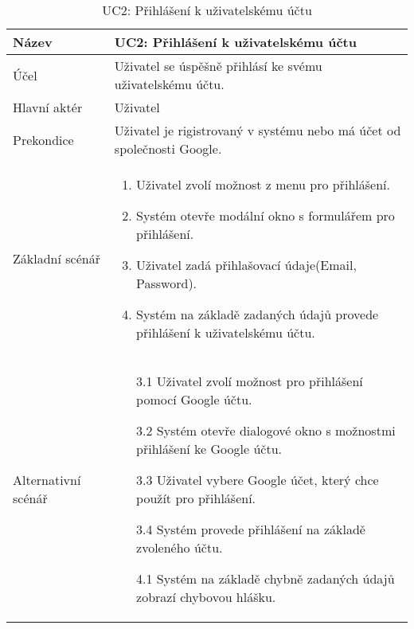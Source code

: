\begin{table}[h]
	\caption{UC2: Přihlášení k uživatelskému účtu}
	\label{tab:uc3}
\begin{tabular}{p{4cm} | p{12cm} }
Název & UC2: Přihlášení k uživatelskému účtu \\ \hline
Účel &   Uživatel se úspěšně přihlásí ke svému uživatelskému účtu. \\\hline
Hlavní aktér  & Uživatel  \\ \hline
Prekondice & Uživatel je rigistrovaný v systému nebo má účet od společnosti Google. \\ \hline

        Základní scénář &  \begin{enumerate}
     \item Uživatel zvolí možnost z menu pro přihlášení.
     \item Systém otevře modální okno s formulářem pro přihlášení.
     \item Uživatel zadá přihlašovací údaje(Email, Password).
     \item Systém na základě zadaných údajů provede přihlášení k uživatelskému účtu. 

\end{enumerate}\\ \hline
Alternativní scénář  & 

\begin{itemize}
    \item [3.1] Uživatel zvolí možnost pro přihlášení pomocí Google účtu. 
    \item [3.2] Systém otevře dialogové okno s možnostmi přihlášení ke Google účtu. 
    \item [3.3] Uživatel vybere Google účet, který chce použít pro přihlášení.
    \item [3.4] Systém provede přihlášení na základě zvoleného účtu. 
    \item [4.1]  Systém na základě chybně zadaných údajů zobrazí chybovou hlášku. 
\end{itemize}
\\ \hline

\end{tabular}\  
\end{table}

